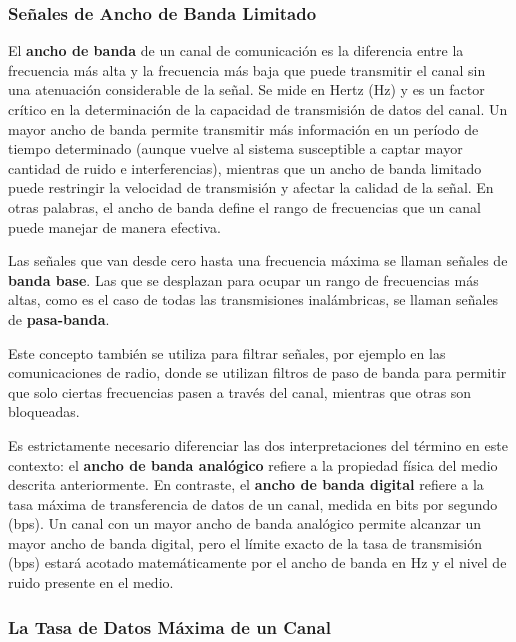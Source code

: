 \subsubsection{Señales de Ancho de Banda Limitado}

\begin{definicion}
  El \textbf{ancho de banda} de un canal de comunicación es la diferencia entre la frecuencia más alta y la frecuencia más baja que puede transmitir el canal sin una atenuación considerable de la señal. Se mide en Hertz (Hz) y es un factor crítico en la determinación de la capacidad de transmisión de datos del canal. Un mayor ancho de banda permite transmitir más información en un período de tiempo determinado (aunque vuelve al sistema susceptible a captar mayor cantidad de ruido e interferencias), mientras que un ancho de banda limitado puede restringir la velocidad de transmisión y afectar la calidad de la señal. En otras palabras, el ancho de banda define el rango de frecuencias que un canal puede manejar de manera efectiva.

  Las señales que van desde cero hasta una frecuencia máxima se llaman señales de \textbf{banda base}. Las que se desplazan para ocupar un rango de frecuencias más altas, como es el caso de todas las transmisiones inalámbricas, se llaman señales de \textbf{pasa-banda}.

  Este concepto también se utiliza para filtrar señales, por ejemplo en las comunicaciones de radio, donde se utilizan filtros de paso de banda para permitir que solo ciertas frecuencias pasen a través del canal, mientras que otras son bloqueadas.

  Es estrictamente necesario diferenciar las dos interpretaciones del término en este contexto: el \textbf{ancho de banda analógico} refiere a la propiedad física del medio descrita anteriormente. En contraste, el \textbf{ancho de banda digital} refiere a la tasa máxima de transferencia de datos de un canal, medida en bits por segundo (bps). Un canal con un mayor ancho de banda analógico permite alcanzar un mayor ancho de banda digital, pero el límite exacto de la tasa de transmisión (bps) estará acotado matemáticamente por el ancho de banda en Hz y el nivel de ruido presente en el medio.
\end{definicion}

\subsubsection{La Tasa de Datos Máxima de un Canal}

